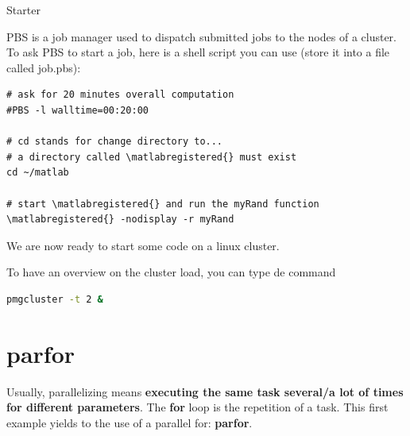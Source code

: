 \documentclass{emse-exo}
\begin{document}
\begin{question}{Starter}
 \item PBS is a job manager used to dispatch submitted jobs to the nodes of a cluster. To ask PBS to start a job, here is a shell script you can use (store it into a file called job.pbs):
\begin{lstlisting}[language=ksh]
# ask for 20 minutes overall computation
#PBS -l walltime=00:20:00

# cd stands for change directory to...
# a directory called \matlabregistered{} must exist
cd ~/matlab

# start \matlabregistered{} and run the myRand function
\matlabregistered{} -nodisplay -r myRand
\end{lstlisting}
We are now ready to start some \matlabregistered{} code on a linux cluster.

\item To have an overview on the cluster load, you can type de command
\begin{lstlisting}[language=sh]
 pmgcluster -t 2 &
\end{lstlisting}

\end{question}


\section{parfor}
Usually, parallelizing means \textbf{executing the same task several/a lot of times for different parameters}. The \textbf{for} loop is the repetition of a task. This first example yields to the use of a parallel for: \textbf{parfor}.
\end{document}
